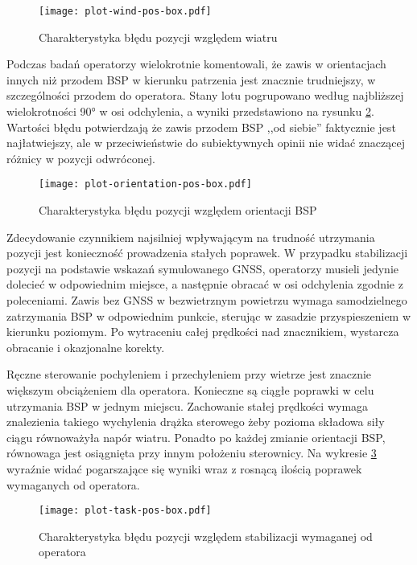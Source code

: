 \begin{figure}[!h]
    \centering \texttt{[image: plot-wind-pos-box.pdf]}
    \caption{Charakterystyka błędu pozycji względem wiatru}
    \label{fig:plot-wind-pos-box}
\end{figure}

Podczas badań operatorzy wielokrotnie komentowali, że zawis w orientacjach innych niż przodem BSP w kierunku patrzenia jest znacznie trudniejszy, w szczególności przodem do operatora. Stany lotu pogrupowano według najbliższej wielokrotności 90° w osi odchylenia, a wyniki przedstawiono na rysunku \ref{fig:plot-orientation-pos-box}. Wartości błędu potwierdzają że zawis przodem BSP ,,od siebie'' faktycznie jest najłatwiejszy, ale w przeciwieństwie do subiektywnych opinii nie widać znaczącej różnicy w pozycji odwróconej.

\begin{figure}[!h]
    \centering \texttt{[image: plot-orientation-pos-box.pdf]}
    \caption{Charakterystyka błędu pozycji względem orientacji BSP}
    \label{fig:plot-orientation-pos-box}
\end{figure}

Zdecydowanie czynnikiem najsilniej wpływającym na trudność utrzymania pozycji jest konieczność prowadzenia stałych poprawek. W przypadku stabilizacji pozycji na podstawie wskazań symulowanego GNSS, operatorzy musieli jedynie dolecieć w odpowiednim miejsce, a następnie obracać w osi odchylenia zgodnie z poleceniami. Zawis bez GNSS w bezwietrznym powietrzu wymaga samodzielnego zatrzymania BSP w odpowiednim punkcie, sterując w zasadzie przyspieszeniem w kierunku poziomym. Po wytraceniu całej prędkości nad znacznikiem, wystarcza obracanie i okazjonalne korekty.

Ręczne sterowanie pochyleniem i przechyleniem przy wietrze jest znacznie większym obciążeniem dla operatora. Konieczne są ciągłe poprawki w celu utrzymania BSP w jednym miejscu. Zachowanie stałej prędkości wymaga znalezienia takiego wychylenia drążka sterowego żeby pozioma składowa siły ciągu równoważyła napór wiatru. Ponadto po każdej zmianie orientacji BSP, równowaga jest osiągnięta przy innym położeniu sterownicy. Na wykresie \ref{fig:plot-task-pos-box} wyraźnie widać pogarszające się wyniki wraz z rosnącą ilością poprawek wymaganych od operatora.

\begin{figure}[!h]
    \centering \texttt{[image: plot-task-pos-box.pdf]}
    \caption{Charakterystyka błędu pozycji względem stabilizacji wymaganej od operatora}
    \label{fig:plot-task-pos-box}
\end{figure}

